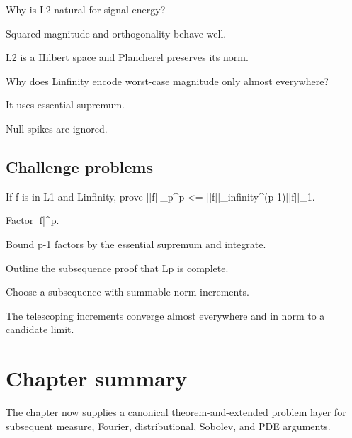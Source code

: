 \begin{exercise}[Energy]\label{exr:iii06-expand-13}
Why is L2 natural for signal energy?
\end{exercise}
\begin{hint}
Squared magnitude and orthogonality behave well.
\end{hint}
\begin{solution}
L2 is a Hilbert space and Plancherel preserves its norm.
\end{solution}

\begin{exercise}\label{exr:iii06-expand-14}
Why does Linfinity encode worst-case magnitude only almost everywhere?
\end{exercise}
\begin{hint}
It uses essential supremum.
\end{hint}
\begin{solution}
Null spikes are ignored.
\end{solution}

\subsection*{Challenge problems}

\begin{exercise}\label{exr:iii06-expand-15}
If f is in L1 and Linfinity, prove ||f||\_p\textasciicircum{}p <= ||f||\_infinity\textasciicircum{}(p-1)||f||\_1.
\end{exercise}
\begin{hint}
Factor |f|\textasciicircum{}p.
\end{hint}
\begin{solution}
Bound p-1 factors by the essential supremum and integrate.
\end{solution}

\begin{exercise}\label{exr:iii06-expand-16}
Outline the subsequence proof that Lp is complete.
\end{exercise}
\begin{hint}
Choose a subsequence with summable norm increments.
\end{hint}
\begin{solution}
The telescoping increments converge almost everywhere and in norm to a candidate limit.
\end{solution}
\section*{Chapter summary}
The chapter now supplies a canonical theorem-and-extended problem layer for subsequent measure, Fourier, distributional, Sobolev, and PDE arguments.
